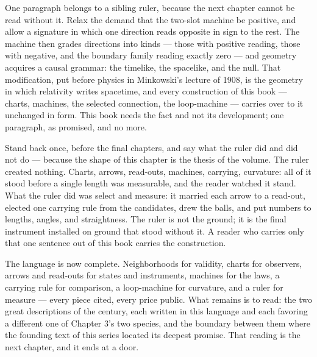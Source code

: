 One paragraph belongs to a sibling ruler, because the next chapter cannot
be read without it. Relax the demand that the two-slot machine be
positive, and allow a signature in which one direction reads opposite in
sign to the rest. The machine then grades directions into kinds ---
those with positive reading, those with negative, and the boundary family
reading exactly zero --- and geometry acquires a causal grammar: the
timelike, the spacelike, and the null. That modification, put before
physics in Minkowski's lecture of 1908, is the geometry in which
relativity writes spacetime, and every construction of this book ---
charts, machines, the selected connection, the loop-machine --- carries
over to it unchanged in form. This book needs the fact and not its
development; one paragraph, as promised, and no more.

Stand back once, before the final chapters, and say what the ruler did
and did not do --- because the shape of this chapter is the thesis of the
volume. The ruler created nothing. Charts, arrows, read-outs, machines,
carrying, curvature: all of it stood before a single length was
measurable, and the reader watched it stand. What the ruler did was
select and measure: it married each arrow to a read-out, elected one
carrying rule from the candidates, drew the balls, and put numbers to
lengths, angles, and straightness. The ruler is not the ground; it is the
final instrument installed on ground that stood without it. A reader who
carries only that one sentence out of this book carries the construction.

The language is now complete. Neighborhoods for validity, charts for
observers, arrows and read-outs for states and instruments, machines for
the laws, a carrying rule for comparison, a loop-machine for curvature,
and a ruler for measure --- every piece cited, every price public. What
remains is to read: the two great descriptions of the century, each
written in this language and each favoring a different one of Chapter 3's
two species, and
the boundary between them where the founding text of this series located
its deepest promise. That reading is the next chapter, and it ends at a
door.

